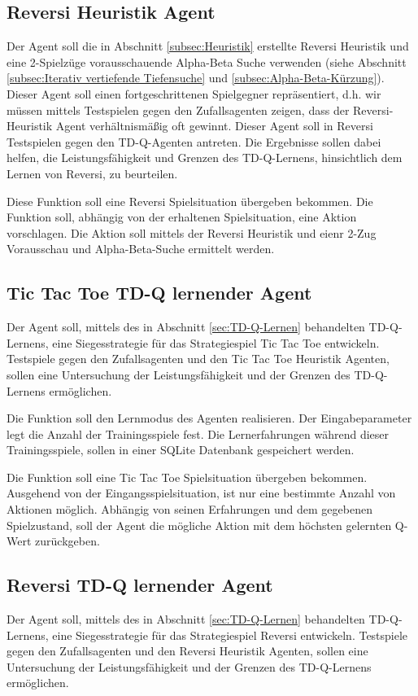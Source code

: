 \subsection{Reversi Heuristik Agent}
Der Agent soll die in Abschnitt \ref{subsec:Heuristik} erstellte Reversi Heuristik und eine 2-Spielzüge vorausschauende Alpha-Beta Suche verwenden (siehe Abschnitt \ref{subsec:Iterativ vertiefende Tiefensuche} und \ref{subsec:Alpha-Beta-Kürzung}). Dieser Agent soll einen fortgeschrittenen Spielgegner repräsentiert, d.h. wir müssen mittels Testspielen gegen den Zufallsagenten zeigen, dass der Reversi-Heuristik Agent verhältnismäßig oft gewinnt. Dieser Agent soll in Reversi Testspielen gegen den TD-Q-Agenten antreten. Die Ergebnisse sollen dabei helfen, die Leistungsfähigkeit und Grenzen des TD-Q-Lernens, hinsichtlich dem Lernen von Reversi, zu beurteilen.

Diese Funktion soll eine Reversi Spielsituation übergeben bekommen. Die Funktion soll, abhängig von der erhaltenen Spielsituation, eine Aktion vorschlagen. Die Aktion soll mittels der Reversi Heuristik und eienr 2-Zug Vorausschau und Alpha-Beta-Suche ermittelt werden.

\subsection{Tic Tac Toe TD-Q lernender Agent}
Der Agent soll, mittels des in Abschnitt \ref{sec:TD-Q-Lernen} behandelten TD-Q-Lernens, eine Siegesstrategie für das Strategiespiel Tic Tac Toe entwickeln. Testspiele gegen den Zufallsagenten und den Tic Tac Toe Heuristik Agenten, sollen eine Untersuchung der Leistungsfähigkeit und der Grenzen des TD-Q-Lernens ermöglichen.

Die Funktion soll den Lernmodus des Agenten realisieren. Der Eingabeparameter legt die Anzahl der Trainingsspiele fest. Die Lernerfahrungen während dieser Trainingsspiele, sollen in einer SQLite Datenbank gespeichert werden.

Die Funktion soll eine Tic Tac Toe Spielsituation übergeben bekommen. Ausgehend von der Eingangsspielsituation, ist nur eine bestimmte Anzahl von Aktionen möglich. Abhängig von seinen Erfahrungen und dem gegebenen Spielzustand, soll der Agent die mögliche Aktion mit dem höchsten gelernten Q-Wert zurückgeben.

\subsection{Reversi TD-Q lernender Agent}
Der Agent soll, mittels des in Abschnitt \ref{sec:TD-Q-Lernen} behandelten TD-Q-Lernens, eine Siegesstrategie für das Strategiespiel Reversi entwickeln. Testspiele gegen den Zufallsagenten und den Reversi Heuristik Agenten, sollen eine Untersuchung der Leistungsfähigkeit und der Grenzen des TD-Q-Lernens ermöglichen.

